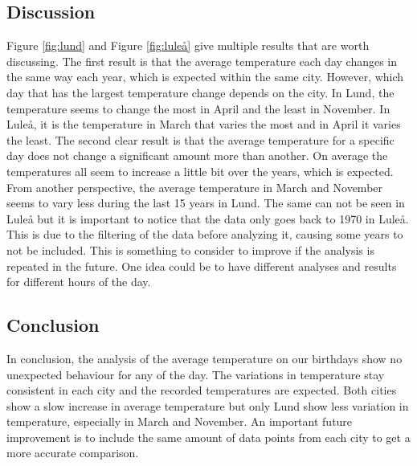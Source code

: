 \subsection{Discussion}
Figure \ref{fig:lund} and Figure \ref{fig:luleå} give multiple results that are worth discussing. The first result is that the average temperature each day changes in the same way each year, which is expected within the same city. However, which day that has the largest temperature change depends on the city. In Lund, the temperature seems to change the most in April and the least in November. In Luleå, it is the temperature in March that varies the most and in April it varies the least. The second clear result is that the average temperature for a specific day does not change a significant amount more than another. On average the temperatures all seem to increase a little bit over the years, which is expected. From another perspective, the average temperature in March and November seems to vary less during the last 15 years in Lund. The same can not be seen in Luleå but it is important to notice that the data only goes back to 1970 in Luleå. This is due to the filtering of the data before analyzing it, causing some years to not be included. This is something to consider to improve if the analysis is repeated in the future. One idea could be to have different analyses and results for different hours of the day. 

\subsection{Conclusion}
In conclusion, the analysis of the average temperature on our birthdays show no unexpected behaviour for any of the day. The variations in temperature stay consistent in each city and the recorded temperatures are expected. Both cities show a slow increase in average temperature but only Lund show less variation in temperature, especially in March and November. An important future improvement is to include the same amount of data points from each city to get a more accurate comparison. 
